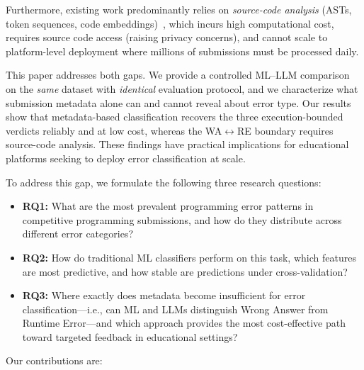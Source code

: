 \documentclass[acmsmall]{acmart}
\begin{document}
Furthermore, existing work predominantly relies on \textit{source-code
analysis} (ASTs, token sequences, code
embeddings)~\cite{feng2020codebert}, which incurs high
computational cost, requires source code access (raising privacy concerns),
and cannot scale to platform-level deployment where millions of submissions
must be processed daily.

This paper addresses both gaps. We provide a controlled ML--LLM comparison
on the \emph{same} dataset with \emph{identical} evaluation protocol, and we
characterize what submission metadata alone can and cannot reveal about error
type. Our results show that metadata-based classification recovers the three
execution-bounded verdicts reliably and at low cost, whereas the
WA$\leftrightarrow$RE boundary requires source-code analysis. These findings
have practical implications for educational platforms seeking to deploy error
classification at scale.

To address this gap, we formulate the following three research questions:

\begin{itemize}
 \item \textbf{RQ1:} What are the most prevalent programming error patterns
 in competitive programming submissions, and how do they distribute
 across different error categories?
 \item \textbf{RQ2:} How do traditional ML classifiers perform on this task,
 which features are most predictive, and how stable are predictions
 under cross-validation?
 \item \textbf{RQ3:} Where exactly does metadata become insufficient for
 error classification---i.e., can ML and LLMs distinguish Wrong Answer
 from Runtime Error---and which approach provides the most
 cost-effective path toward targeted feedback in educational settings?
\end{itemize}

Our contributions are:
\end{document}
